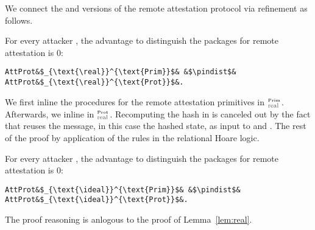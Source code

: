 %
We connect the \real and \ideal versions of the
remote attestation protocol via refinement as follows.
%
\begin{lemma}\label{lem:real}
    For every attacker \A, the advantage to distinguish
    the \real packages for remote attestation is $0$:
    \begin{center}
        \begin{minipage}{0.5\columnwidth}
    \begin{verbatim}
AttProt&$_{\text{\real}}^{\text{Prim}}$& &$\pindist$& AttProt&$_{\text{\real}}^{\text{Prot}}$&.
    \end{verbatim}
    \end{minipage}
    \end{center}
\end{lemma}
%
\begin{IEEEproof}
    We first inline the procedures for the remote 
    attestation primitives in \pattprot$_{\text{\real}}^{_\text{Prim}}$.
    Afterwards, we inline \psigprot in \pattprot$_{\text{\real}}^{_\text{Prot}}$.
    Recomputing the hash in \everifya is canceled
    out by the fact that \psigprot reuses the message,
    in this case the hashed state, as input to \esign
    and \eversig.
    The rest of the proof by application of the rules
    in the relational Hoare logic.
\end{IEEEproof}
%
\begin{lemma}\label{lem:ideal}
    For every attacker \A, the advantage to distinguish
    the \ideal packages for remote attestation is $0$: 
    \begin{center}
        \begin{minipage}{0.5\columnwidth}
    \begin{verbatim}
AttProt&$_{\text{\ideal}}^{\text{Prim}}$& &$\pindist$& AttProt&$_{\text{\ideal}}^{\text{Prot}}$&.
    \end{verbatim}
    \end{minipage}
    \end{center}
\end{lemma}
%
\begin{IEEEproof}
%
The proof reasoning is anlogous to
the proof of Lemma~\ref{lem:real}.
%
\end{IEEEproof}
